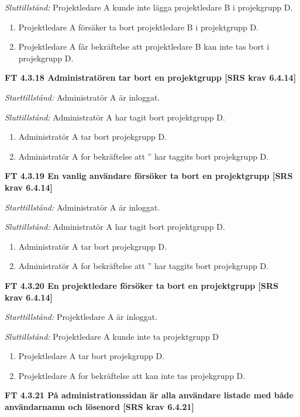 \documentclass[a4paper]{article}
\begin{document}
\emph{Sluttillstånd:} Projektledare A kunde inte lägga  projektledare B i projekgrupp D.

\begin{enumerate}
\item Projektledare A försäker ta bort projektledare B i  projektgrupp D.
\item Projektledare A får bekräftelse att projektledare B kan inte tas bort  i projekgrupp D.
\end{enumerate}

\textbf{FT 4.3.18 Administratören tar bort en projektgrupp [SRS krav 6.4.14]}

\emph{Starttillstånd:} Administratör A är inloggat.

\emph{Sluttillstånd:} Administratör A har tagit bort  projektgrupp D.

\begin{enumerate}
\item Administratör A tar bort  projekgrupp D.
\item Administratör A for bekräftelse att ” har taggits  bort  projekgrupp D.
\end{enumerate}

\textbf{FT 4.3.19 En vanlig användare försöker ta bort en projektgrupp [SRS krav 6.4.14]}

\emph{Starttillstånd:} Administratör A är inloggat.

\emph{Sluttillstånd:} Administratör A har tagit bort  projektgrupp D.

\begin{enumerate}
\item Administratör A tar bort  projekgrupp D.
\item Administratör A for bekräftelse att ” har taggits  bort  projekgrupp D.
\end{enumerate}

\textbf{FT 4.3.20 En projektledare försöker ta bort en projektgrupp [SRS krav 6.4.14]}

\emph{Starttillstånd:} Projektledare A är inloggat.

\emph{Sluttillstånd:} Projektledare A kunde inte ta  projektgrupp D

\begin{enumerate}
\item Projektledare A  tar bort  projekgrupp D.
\item Projektledare A for bekräftelse att kan inte tas  projekgrupp D.
\end{enumerate}

\textbf{FT 4.3.21 På administrationssidan är alla användare listade med både användarnamn och lösenord [SRS krav 6.4.21]}
\end{document}
